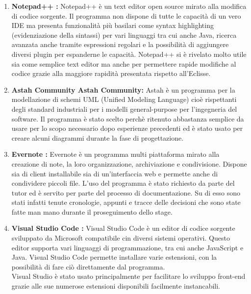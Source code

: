 \begin{enumerate}
\item \textbf{Notepad++  : } Notepad++ è un text editor open source mirato alla modifica di codice sorgente. Il programma non dispone di tutte le capacità di un vero IDE ma presenta funzionalità più basilari come syntax highlighting (evidenziazione della sintassi) per 
vari linguaggi tra cui anche Java, ricerca avanzata anche tramite espressioni regolari e la possibilità di aggiungere diversi plugin per espanderne le capacità.
Notepad++ si è rivelato molto utile sia come semplice text editor ma anche per permettere rapide modifiche al codice grazie alla maggiore rapidità presentata rispetto all'Eclisse.

\item \textbf{Astah Community Astah Community: } Astah è un programma per la modellazione di schemi UML (Unified Modeling Language) cioè rispettanti degli standard industriali per i modelli general-purpose per l’ingegneria del software.
Il programma è stato scelto perchè ritenuto abbastanza semplice da usare per lo scopo necessario dopo esperienze precedenti ed è stato usato per creare alcuni diagrammi durante la fase di progettazione.

\item \textbf{Evernote :} Evernote è un programma multi piattaforma mirato alla creazione di note, la loro organizzazione, archiviazione e condivisione. Dispone sia di client installabile sia di un’interfaccia web e permette anche di condividere piccoli file.
L’uso del programma è stato richiesto da parte del tutor ed è servito per parte del processo di documentazione. Su di esso sono stati infatti tenute cronologie, appunti e tracce delle decisioni che sono state fatte man mano durante il proseguimento dello stage.

\item \textbf{Visual Studio Code :}
Visual Studio Code è un editor di codice sorgente sviluppato da Microsoft compatibile cin diversi sistemi operativi.
Questo editor supporta vari linguaggi di programmazione, tra cui anche JavaScript e Java.
Visual Studio Code permette installare varie estensioni, con la possibilità di fare ciò direttamente dal programma. \\
Visual Studio è stato usato principalmente per facilitare lo sviluppo front-end grazie alle sue numerose estensioni disponibili facilmente instancabili. 


\end{enumerate}
